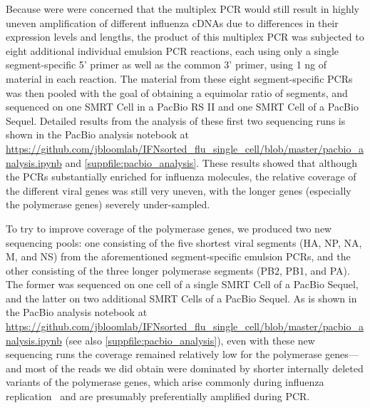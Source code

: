 \documentclass[10pt,letterpaper]{article}
\newcommand{\SUPPFILE}[1]{\autoref{suppfile:#1}}
\begin{document}
Because were were concerned that the multiplex PCR would still result in highly uneven amplification of different influenza cDNAs due to differences in their expression levels and lengths, the product of this multiplex PCR was subjected to eight additional individual emulsion PCR reactions, each using only a single segment-specific 5' primer as well as the common 3' primer, using 1 ng of material in each reaction.
The material from these eight segment-specific PCRs was then pooled with the goal of obtaining a equimolar ratio of segments, and sequenced on one SMRT Cell in a PacBio RS II and one SMRT Cell of a PacBio Sequel. 
Detailed results from the analysis of these first two sequencing runs is shown in the PacBio analysis notebook at \url{https://github.com/jbloomlab/IFNsorted_flu_single_cell/blob/master/pacbio_analysis.ipynb} and \SUPPFILE{pacbio_analysis}.
These results showed that although the PCRs substantially enriched for influenza molecules, the relative coverage of the different viral genes was still very uneven, with the longer genes (especially the polymerase genes) severely under-sampled.

To try to improve coverage of the polymerase genes, we produced two new sequencing pools: one consisting of the five shortest viral segments (HA, NP, NA, M, and NS) from the aforementioned segment-specific emulsion PCRs, and the other consisting of the three longer polymerase segments (PB2, PB1, and PA).
The former was sequenced on one cell of a single SMRT Cell of a PacBio Sequel, and the latter on two additional SMRT Cells of a PacBio Sequel. 
As is shown in the PacBio analysis notebook at \url{https://github.com/jbloomlab/IFNsorted_flu_single_cell/blob/master/pacbio_analysis.ipynb} (see also \SUPPFILE{pacbio_analysis}), even with these new sequencing runs the coverage remained relatively low for the polymerase genes---and most of the reads we did obtain were dominated by shorter internally deleted variants of the polymerase genes, which arise commonly during influenza replication~\cite{xue2016propagation} and are presumably preferentially amplified during PCR.
\end{document}
